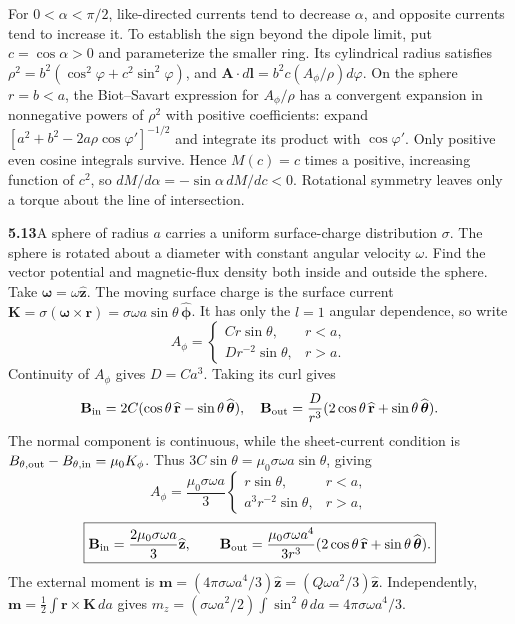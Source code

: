 For $0<\alpha<\pi/2$, like-directed currents tend to decrease $\alpha$,
and opposite currents tend to increase it. To establish the sign beyond
the dipole limit, put $c=\cos\alpha>0$ and parameterize the smaller ring.
Its cylindrical radius satisfies
$\rho^2=b^2(\cos^2\varphi+c^2\sin^2\varphi)$, and
$\mathbf A\cdot d\mathbf l=b^2c(A_\phi/\rho)d\varphi$.
On the sphere $r=b<a$, the Biot--Savart expression for $A_\phi/\rho$
has a convergent expansion in nonnegative powers of $\rho^2$ with
positive coefficients: expand
$[a^2+b^2-2a\rho\cos\varphi']^{-1/2}$ and integrate its product with
$\cos\varphi'$. Only positive even cosine integrals survive.
Hence $M(c)=c$ times a positive, increasing function of $c^2$,
so $dM/d\alpha=-\sin\alpha\,dM/dc<0$.
Rotational symmetry leaves only a torque about the line of intersection.


\par\bigskip
\noindent\textbf{5.13}\quad A sphere of radius $a$ carries a uniform surface-charge distribution $\sigma$. The sphere is rotated about a diameter with constant angular velocity $\omega$. Find the vector potential and magnetic-flux density both inside and outside the sphere.
\solution
Take $\boldsymbol\omega=\omega\widehat{\mathbf z}$. The moving surface
charge is the surface current
$\mathbf K=\sigma(\boldsymbol\omega\times\mathbf r)
=\sigma\omega a\sin\theta\,\widehat{\boldsymbol\phi}$.
It has only the $l=1$ angular dependence, so write
\[
A_\phi=\begin{cases}Cr\sin\theta,&r<a,\\D r^{-2}\sin\theta,&r>a.\end{cases}
\]
Continuity of $A_\phi$ gives $D=Ca^3$. Taking its curl gives
\[
\mathbf B_{\rm in}=2C(\cos\theta\,\widehat{\mathbf r}
-\sin\theta\,\widehat{\boldsymbol\theta}),\quad
\mathbf B_{\rm out}=\frac D{r^3}
(2\cos\theta\,\widehat{\mathbf r}+\sin\theta\,\widehat{\boldsymbol\theta}).
\]
The normal component is continuous, while the sheet-current condition is
$B_{\theta,\rm out}-B_{\theta,\rm in}=\mu_0K_\phi$.
Thus $3C\sin\theta=\mu_0\sigma\omega a\sin\theta$, giving
\[
\boxed{A_\phi=\frac{\mu_0\sigma\omega a}{3}
\begin{cases}r\sin\theta,&r<a,\\a^3r^{-2}\sin\theta,&r>a,\end{cases}}
\]
\[
\boxed{\mathbf B_{\rm in}=\frac{2\mu_0\sigma\omega a}{3}\widehat{\mathbf z},
\qquad
\mathbf B_{\rm out}=\frac{\mu_0\sigma\omega a^4}{3r^3}
(2\cos\theta\,\widehat{\mathbf r}+\sin\theta\,\widehat{\boldsymbol\theta}).}
\]
The external moment is
$\mathbf m=(4\pi\sigma\omega a^4/3)\widehat{\mathbf z}
=(Q\omega a^2/3)\widehat{\mathbf z}$.
Independently, $\mathbf m=\frac12\int\mathbf r\times\mathbf K\,da$
gives $m_z=(\sigma\omega a^2/2)\int\sin^2\theta\,da
=4\pi\sigma\omega a^4/3$.


